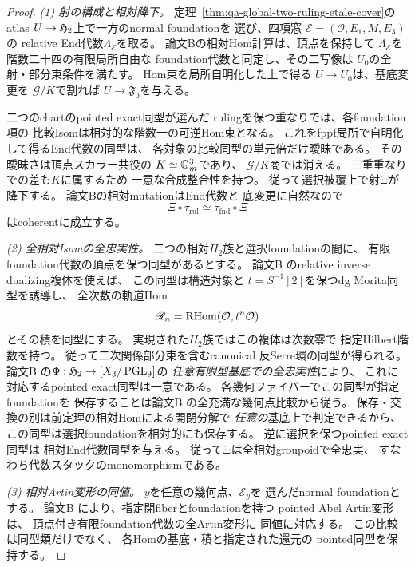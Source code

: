 \begin{proof}
\emph{(1) 射の構成と相対降下。}
定理~\ref{thm:qa-global-two-ruling-etale-cover}の
atlas $U\to\mathfrak H_2$上で一方のnormal foundationを
選び、四項窓
$\mathcal E=(\mathcal O,E_1,M,E_3)$の
relative End代数$\Lambda_{\mathcal E}$を取る。
論文Bの相対Hom計算は、頂点を保持して
$\Lambda_{\mathcal E}$を階数二十四の有限局所自由な
foundation代数と同定し、その二写像は
$U_0$の全射・部分束条件を満たす。
Hom束を局所自明化した上で得る
$U\to U_0$は、基底変更を
$\mathcal G/K$で割れば
$U\to\mathfrak F_0$を与える。

二つのchartのpointed exact同型が選んだ
rulingを保つ重なりでは、各foundation項の
比較Isomは相対的な階数一の可逆Hom束となる。
これをfppf局所で自明化して得るEnd代数の同型は、
各対象の比較同型の単元倍だけ曖昧である。
その曖昧さは頂点スカラー共役の
$K\simeq\mathbb G_m^3$であり、
$\mathcal G/K$商では消える。
三重重なりでの差も$K$に属するため
一意な合成整合性を持つ。
従って選択被覆上で射$\Xi$が降下する。
論文Bの相対mutationはEnd代数と
底変更に自然なので
\[
 \Xi\circ\tau_{\mathrm{rul}}
   \simeq\tau_{\mathrm{fnd}}\circ\Xi
\]
はcoherentに成立する。

\emph{(2) 全相対Isomの全忠実性。}
二つの相対$H_2$族と選択foundationの間に、
有限foundation代数の頂点を保つ同型があるとする。
論文B
\cite[\texttt{lem:foundation-relative-antiserre-perfect}]{QuadricModuli2026}
のrelative inverse dualizing複体を使えば、
この同型は構造対象と
$t=S^{-1}[2]$を保つdg Morita同型を誘導し、
全次数の軌道Hom
\[
 \mathscr R_n=
   \operatorname{RHom}(\mathcal O,t^n\mathcal O)
\]
とその積を同型にする。
実現された$H_2$族ではこの複体は次数零で
指定Hilbert階数を持つ。
従って二次関係部分束を含むcanonical
反Serre環の同型が得られる。
論文B
\cite[\texttt{prop:relative-h2-stack-recognition}]{QuadricModuli2026}
の$\Phi:\mathfrak H_2\to[X_3/\operatorname{PGL}_9]$の
\emph{任意有限型基底での全忠実性}により、
これに対応するpointed exact同型は一意である。
各幾何ファイバーでこの同型が指定foundationを
保存することは論文B
\cite[\texttt{cor:h2-point-groupoid-foundation}]{QuadricModuli2026}
の全充満な幾何点比較から従う。
保存・交換の別は前定理の相対Homによる開閉分解で
\emph{任意の}基底上で判定できるから、
この同型は選択foundationを相対的にも保存する。
逆に選択を保つpointed exact同型は
相対End代数同型を与える。
従って$\Xi$は全相対groupoidで全忠実、
すなわち代数スタックのmonomorphismである。

\emph{(3) 相対Artin変形の同値。}
$y$を任意の幾何点、$\mathcal E_y$を
選んだnormal foundationとする。
論文B
\cite[\texttt{thm:artin-foundation-lift},
\texttt{lem:foundation-artin-deformation}]{QuadricModuli2026}
により、指定閉fiberとfoundationを持つ
pointed Abel Artin変形は、
頂点付き有限foundation代数の全Artin変形に
同値に対応する。
この比較は同型類だけでなく、
各Homの基底・積と指定された還元の
pointed同型を保持する。


\end{proof}
